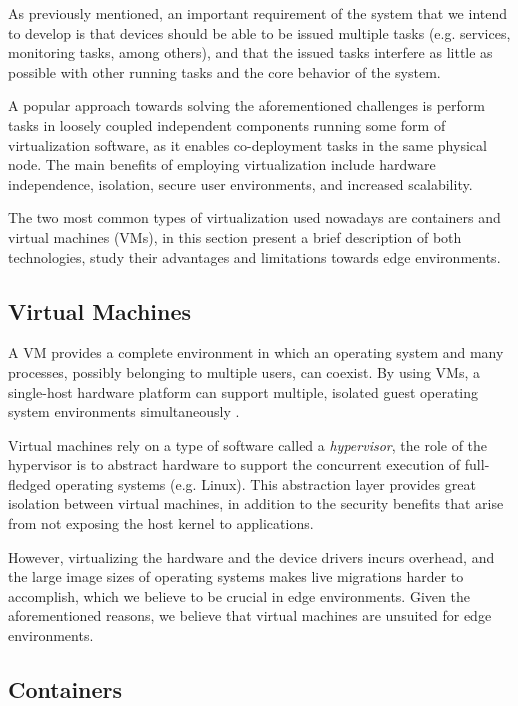 
As previously mentioned, an important requirement of the system that we intend to develop is that devices should be able to be issued multiple tasks (e.g. services, monitoring tasks, among others), and that the issued tasks interfere as little as possible with other running tasks and the core behavior of the system.

A popular approach towards solving the aforementioned challenges is perform tasks in loosely coupled independent components running some form of virtualization software, as it enables co-deployment tasks in the same physical node. The main benefits of employing virtualization include hardware independence, isolation, secure user environments, and increased scalability. 

The two most common types of virtualization used nowadays are containers and virtual machines (VMs), in this section present a brief description of both technologies, study their advantages and limitations towards edge environments.

\subsection{Virtual Machines}

A VM provides a complete environment in which an operating system and many processes, possibly belonging to multiple users, can coexist. By using VMs, a single-host hardware platform can support multiple, isolated guest operating system environments simultaneously \cite{1430629}. 

Virtual machines rely on a type of software called a \textit{hypervisor}, the role of the hypervisor is to abstract hardware to support the concurrent execution of full-fledged operating systems (e.g. Linux). This abstraction layer provides great isolation between virtual machines, in addition to the security benefits that arise from not exposing the host kernel to applications. 

However, virtualizing the hardware and the device drivers incurs overhead, and the large image sizes of operating systems makes live migrations harder to accomplish, which we believe to be crucial in edge environments. Given the aforementioned reasons, we believe that virtual machines are unsuited for edge environments.

\subsection{Containers}

